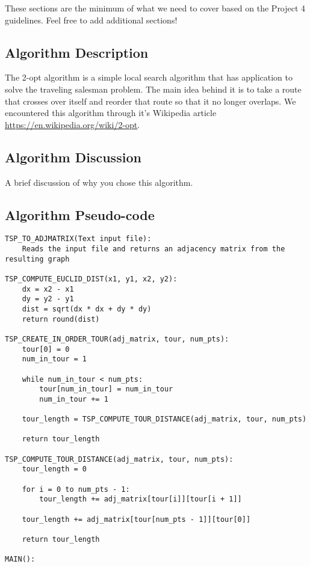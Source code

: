 \documentclass[../report/main.tex]{subfiles}
\begin{document}
These sections are the minimum of what we need to cover based on the Project 4 guidelines. Feel free to add additional sections!

\subsection*{Algorithm Description}

The 2-opt algorithm is a simple local search algorithm that has application to solve the traveling salesman problem. The main idea behind it is to take a route that crosses over itself and reorder that route so that it no longer overlaps. We encountered this algorithm through it's Wikipedia article \url{https://en.wikipedia.org/wiki/2-opt}.

\subsection*{Algorithm Discussion}

A brief discussion of why you chose this algorithm.

\subsection*{Algorithm Pseudo-code}

\begin{verbatim}
TSP_TO_ADJMATRIX(Text input file):
    Reads the input file and returns an adjacency matrix from the resulting graph

TSP_COMPUTE_EUCLID_DIST(x1, y1, x2, y2):
    dx = x2 - x1
    dy = y2 - y1
    dist = sqrt(dx * dx + dy * dy)
    return round(dist)

TSP_CREATE_IN_ORDER_TOUR(adj_matrix, tour, num_pts):
    tour[0] = 0
    num_in_tour = 1

    while num_in_tour < num_pts:
        tour[num_in_tour] = num_in_tour
        num_in_tour += 1

    tour_length = TSP_COMPUTE_TOUR_DISTANCE(adj_matrix, tour, num_pts)

    return tour_length

TSP_COMPUTE_TOUR_DISTANCE(adj_matrix, tour, num_pts):
    tour_length = 0

    for i = 0 to num_pts - 1:
        tour_length += adj_matrix[tour[i]][tour[i + 1]]

    tour_length += adj_matrix[tour[num_pts - 1]][tour[0]]

    return tour_length

MAIN():
    
\end{verbatim}
\end{document}

